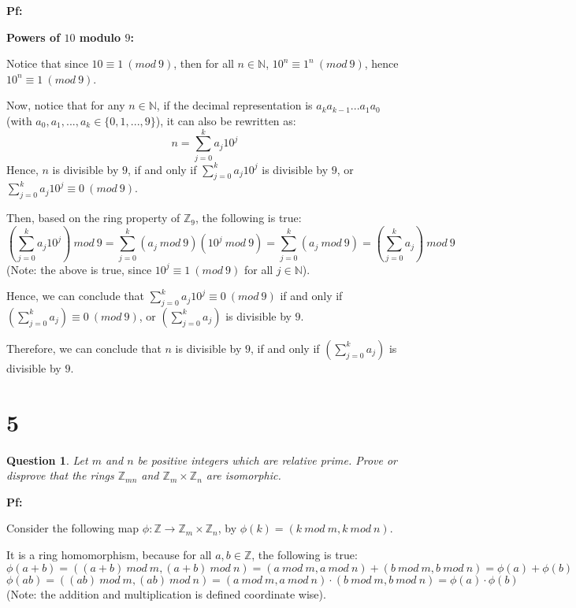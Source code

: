 \documentclass{article}
\newtheorem{question}{Question}
\begin{document}
\textbf{Pf:}

\textbf{Powers of $10$ modulo $9$:}

Notice that since $10\equiv 1\ (mod\ 9)$, then for all $n\in\mathbb{N}$, $10^n\equiv 1^n\ (mod\ 9)$, hence $10^n\equiv 1\ (mod\ 9)$.

\hfill

Now, notice that for any $n\in\mathbb{N}$, if the decimal representation is $a_ka_{k-1}...a_1a_0$ (with $a_0,a_1,...,a_k\in \{0,1,...,9\}$), 
it can also be rewritten as:
$$n=\sum_{j=0}^{k}a_j10^j$$
Hence, $n$ is divisible by $9$, if and only if $\sum_{j=0}^{k}a_j10^j$ is divisible by $9$, or $\sum_{j=0}^{k}a_j10^j \equiv 0\ (mod\ 9)$.

Then, based on the ring property of $\mathbb{Z}_9$, the following is true:
$$\left(\sum_{j=0}^{k}a_j10^j\right)\ mod\ 9=\sum_{j=0}^{k}(a_j\ mod\ 9)(10^j\ mod\ 9)=\sum_{j=0}^{k}(a_j\ mod\ 9) = \left(\sum_{j=0}^{k}a_j\right)\ mod\ 9$$
(Note: the above is true, since $10^j\equiv 1\ (mod\ 9)$ for all $j\in\mathbb{N}$).

Hence, we can conclude that $\sum_{j=0}^{k}a_j10^j \equiv 0\ (mod\ 9)$ if and only if $\left(\sum_{j=0}^{k}a_j\right)\equiv 0\ (mod\ 9)$, or $\left(\sum_{j=0}^{k}a_j\right)$ is divisible by $9$.

Therefore, we can conclude that $n$ is divisible by $9$, if and only if  $\left(\sum_{j=0}^{k}a_j\right)$ is divisible by $9$.


\break

\section*{5}
\begin{myBox}[]{}
    \begin{question}
        Let $m$ and $n$ be positive integers which are relative prime. Prove or disprove that
        the rings $\mathbb{Z}_{mn}$ and $\mathbb{Z}_m\times \mathbb{Z}_n$ are isomorphic.
    \end{question}
\end{myBox}

\textbf{Pf:}

Consider the following map $\phi:\mathbb{Z}\rightarrow \mathbb{Z}_m\times\mathbb{Z}_n$,
by $\phi(k)=(k\ mod\ m,k\ mod\ n)$.

It is a ring homomorphism, because for all $a,b\in\mathbb{Z}$, the following is true:
$$\phi(a+b)=((a+b)\ mod\ m,(a+b)\ mod\ n)=(a\ mod\ m,a\ mod\ n)+(b\ mod\ m,b\ mod\ n) = \phi(a)+\phi(b)$$
$$\phi(ab)=((ab)\ mod\ m, (ab)\ mod\ n)=(a\ mod\ m,a\ mod\ n)\cdot (b\ mod\ m,b\ mod\ n) = \phi(a)\cdot\phi(b)$$
(Note: the addition and multiplication is defined coordinate wise).
\end{document}
